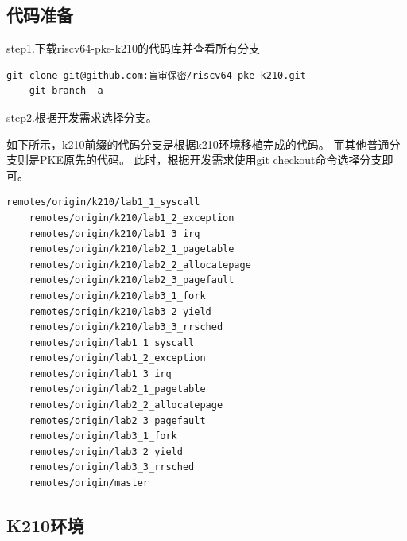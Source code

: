 \subsection{代码准备}

step1.下载riscv64-pke-k210的代码库并查看所有分支

\begin{lstlisting}[caption={下载代码库}, label={lst:download_code}]
    git clone git@github.com:盲审保密/riscv64-pke-k210.git
    git branch -a
\end{lstlisting}

step2.根据开发需求选择分支。

如下所示，k210前缀的代码分支是根据k210环境移植完成的代码。
而其他普通分支则是PKE原先的代码。
此时，根据开发需求使用git checkout命令选择分支即可。

\begin{lstlisting}[caption={分支列表}, label={lst:branch_list}]
    remotes/origin/k210/lab1_1_syscall
    remotes/origin/k210/lab1_2_exception
    remotes/origin/k210/lab1_3_irq
    remotes/origin/k210/lab2_1_pagetable
    remotes/origin/k210/lab2_2_allocatepage
    remotes/origin/k210/lab2_3_pagefault
    remotes/origin/k210/lab3_1_fork
    remotes/origin/k210/lab3_2_yield
    remotes/origin/k210/lab3_3_rrsched
    remotes/origin/lab1_1_syscall
    remotes/origin/lab1_2_exception
    remotes/origin/lab1_3_irq
    remotes/origin/lab2_1_pagetable
    remotes/origin/lab2_2_allocatepage
    remotes/origin/lab2_3_pagefault
    remotes/origin/lab3_1_fork
    remotes/origin/lab3_2_yield
    remotes/origin/lab3_3_rrsched
    remotes/origin/master
\end{lstlisting}

\subsection{K210环境}

